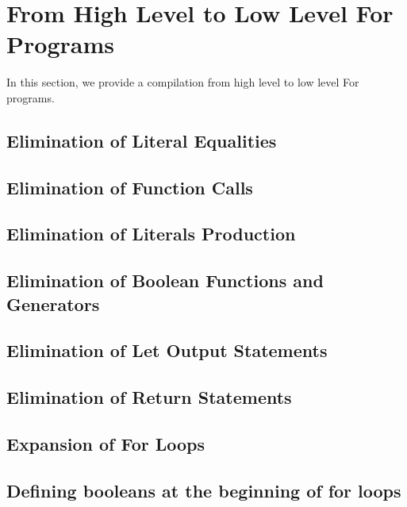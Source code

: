 \section{From High Level to Low Level For Programs}
\label{sec:htl}


In this section, we provide a compilation from
high level to low level For programs.

\subsection{Elimination of Literal Equalities}

\subsection{Elimination of Function Calls}

\subsection{Elimination of Literals Production}

\subsection{Elimination of Boolean Functions and Generators}

\subsection{Elimination of Let Output Statements}

\subsection{Elimination of Return Statements}


\subsection{Expansion of For Loops}

\subsection{Defining booleans at the beginning of for loops}


